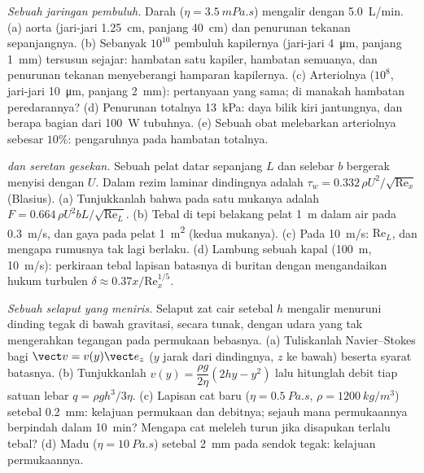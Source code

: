 \begin{exercise}[$\star\star\star$]\label{exo:b2:viscous-flows:10}
\emph{Sebuah jaringan pembuluh.} Darah ($\eta = \qty{3.5}{mPa.s}$) mengalir dengan
\qty{5.0}{L/min}. (a)  aorta (jari-jari \qty{1.25}{cm},
panjang \qty{40}{cm}) dan penurunan tekanan sepanjangnya. (b) Sebanyak $10^{10}$
pembuluh kapilernya (jari-jari \qty{4}{\micro m}, panjang \qty{1}{mm}) tersusun sejajar:
hambatan satu kapiler, hambatan semuanya, dan penurunan tekanan menyeberangi hamparan
kapilernya. (c) Arteriolnya ($10^8$, jari-jari \qty{10}{\micro m}, panjang
\qty{2}{mm}): pertanyaan yang sama; di manakah hambatan peredarannya?
(d) Penurunan totalnya \qty{13}{kPa}: daya bilik kiri jantungnya,
dan berapa bagian dari \qty{100}{W} tubuhnya. (e) Sebuah obat melebarkan
arteriolnya sebesar $10\%$: pengaruhnya pada hambatan totalnya.
\end{exercise}

\begin{exercise}[$\star\star\star$]\label{exo:b2:viscous-flows:11}
\emph{ dan seretan gesekan.} Sebuah pelat datar sepanjang $L$ dan
selebar $b$ bergerak menyisi dengan $U$. Dalam rezim laminar 
dindingnya adalah $\tau_w = 0.332\,\rho U^2/\sqrt{\mathrm{Re}_x}$ (Blasius). (a) Tunjukkanlah bahwa
 pada satu mukanya adalah $F = 0.664\,\rho U^2bL/\sqrt{\mathrm{Re}_L}$.
(b) Tebal  di tepi belakang pelat \qty{1}{m}
dalam air pada \qty{0.3}{m/s}, dan gaya pada pelat \qty{1}{m^2} (kedua
mukanya). (c) Pada \qty{10}{m/s}: $\mathrm{Re}_L$, dan mengapa rumusnya tak lagi
berlaku. (d) Lambung sebuah kapal (\qty{100}{m}, \qty{10}{m/s}): perkiraan tebal
lapisan batasnya di buritan dengan mengandaikan hukum turbulen $\delta \approx
0.37x/\mathrm{Re}_x^{1/5}$.
\end{exercise}

\begin{exercise}[$\star\star\star$]\label{exo:b2:viscous-flows:12}
\emph{Sebuah selaput yang meniris.} Selaput zat cair setebal $h$ mengalir menuruni
dinding tegak di bawah gravitasi, secara tunak, dengan udara yang tak mengerahkan tegangan pada
permukaan bebasnya. (a) Tuliskanlah Navier--Stokes bagi $\vect v = v(y)\vect e_z$ ($y$
jarak dari dindingnya, $z$ ke bawah) beserta syarat batasnya.
(b) Tunjukkanlah $v(y) = \dfrac{\rho g}{2\eta}(2hy - y^2)$ lalu hitunglah debit
tiap satuan lebar $q = \rho gh^3/3\eta$. (c) Lapisan cat baru ($\eta =
\qty{0.5}{Pa.s}$, $\rho = \qty{1200}{kg/m^3}$) setebal \qty{0.2}{mm}: kelajuan
permukaan dan debitnya; sejauh mana permukaannya berpindah dalam \qty{10}{min}? Mengapa
cat meleleh turun jika disapukan terlalu tebal? (d) Madu ($\eta = \qty{10}{Pa.s}$)
setebal \qty{2}{mm} pada sendok tegak: kelajuan permukaannya.
\end{exercise}

